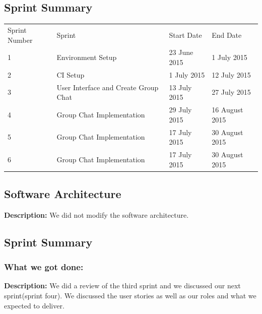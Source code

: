 \documentclass[a4paper]{article}
\begin{document}
\subsection{Sprint Summary}
\setlength{\arrayrulewidth}{0.5mm}
\setlength{\tabcolsep}{12pt}
\renewcommand{\arraystretch}{2} 
\begin{tabular}{ |p{2.5cm}|p{2.5cm}|p{2.5cm} |p{2.5cm}| }
\hline
\rowcolor{lightgray}\multicolumn{4}{|c|}{Sprint Summary} \\
\hline
Sprint Number & Sprint & Start Date & End Date\\
\hline 
1 & Environment Setup & 23 June 2015 & 1 July 2015 \\
\hline
2 & CI Setup & 1 July 2015 & 12 July 2015 \\
\hline
3 & User Interface  and Create Group Chat & 13 July 2015 & 27 July 2015 \\
\hline
4 & Group Chat Implementation & 29 July 2015 & 16 August 2015 \\
\hline
5 & Group Chat Implementation & 17 July 2015 & 30 August 2015 \\
\hline
6 & Group Chat Implementation & 17 July 2015 & 30 August 2015 \\
\hline
\end{tabular}

\subsection{Software Architecture}
\textbf{Description: }We did not modify the software architecture. \\

\subsection{Sprint Summary}
\subsubsection{What we got done: }
\textbf{Description: }We did a review of the third sprint and we discussed our next sprint(sprint four). We discussed the user stories as well as our roles and what we expected to deliver. \\
\end{document}
